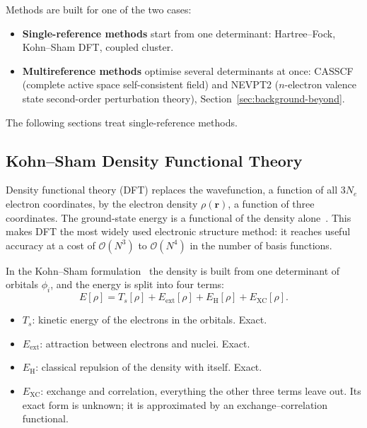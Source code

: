 Methods are built for one of the two cases:

\begin{itemize}
  \item \textbf{Single-reference methods} start from one determinant:
    Hartree--Fock, Kohn--Sham DFT, coupled cluster.
  \item \textbf{Multireference methods} optimise several determinants at
    once: CASSCF (complete active space self-consistent field) and
    NEVPT2 ($n$-electron valence state second-order perturbation theory),
    Section~\ref{sec:background-beyond}.
\end{itemize}

The following sections treat single-reference methods.

\subsection{Kohn--Sham Density Functional Theory}
\label{sec:background-dft}

Density functional theory (DFT) replaces the wavefunction, a function of all
$3N_e$ electron coordinates, by the electron density $\rho(\mathbf{r})$, a
function of three coordinates. The ground-state energy is a functional of
the density alone~\cite{hohenberg1964}. This makes DFT the most widely used
electronic structure method: it reaches useful accuracy at a cost of
$\mathcal{O}(N^3)$ to $\mathcal{O}(N^4)$ in the number of basis functions.

In the Kohn--Sham formulation~\cite{kohn1965} the density is built from one
determinant of orbitals $\phi_i$, and the energy is split into four terms:
%
\begin{equation}
  E[\rho] = T_s[\rho] + E_\text{ext}[\rho] + E_\text{H}[\rho] + E_\text{XC}[\rho] .
  \label{eq:ks-energy}
\end{equation}

\begin{itemize}
  \item $T_s$: kinetic energy of the electrons in the orbitals. Exact.
  \item $E_\text{ext}$: attraction between electrons and nuclei. Exact.
  \item $E_\text{H}$: classical repulsion of the density with itself. Exact.
  \item $E_\text{XC}$: exchange and correlation, everything the other three
    terms leave out. Its exact form is unknown; it is approximated by an
    exchange--correlation functional.
\end{itemize}

